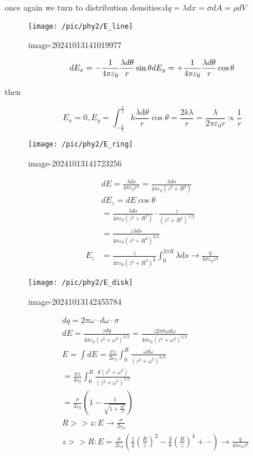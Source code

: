 \documentclass[
]{article}
\begin{document}
once again we turn to distribution
densities:\(\mathrm d q=\lambda d x=\sigma d A=\rho d V\)

\begin{figure}
\centering
\texttt{[image: /pic/phy2/E\_line]}
\caption{image-20241013141019977}
\end{figure}

\[
dE_{x}=-\frac{1}{4\pi\varepsilon_{0}}\frac{\lambda d\theta}{r}\sin\theta\\dE_{y}=+\frac{1}{4\pi\varepsilon_{0}}\frac{\lambda d\theta}{r}\cos\theta
\]

then

\[
E_x=0,E_y=\int_{-{\frac{\pi}{2}}}^{\frac{\pi}{2}} k \frac{\lambda \mathrm d \theta}{r}\cos \theta =\frac{2k\lambda}{r}=\frac{\lambda}{2\pi \varepsilon _0 r}\propto \frac{1}{r}
\]

\begin{figure}
\centering
\texttt{[image: /pic/phy2/E\_ring]}
\caption{image-20241013141723256}
\end{figure}

\[
\begin{aligned}
&dE=\frac{\lambda ds}{4\pi\varepsilon_{0}r^{2}}=\frac{\lambda ds}{4\pi\varepsilon_{0}(z^{2}+R^{2})} \\
&dE_{z}=dE\cos\theta \\
&=\frac{\lambda ds}{4\pi\varepsilon_{0}(z^{2}+R^{2})}\cdot\frac{z}{(z^{2}+R^{2})^{1/2}} \\
&=\frac{z\lambda ds}{4\pi\varepsilon_0(z^2+R^2)^{3/2}}\\E_z&=\frac{z}{4\pi \varepsilon _0(z^2+R^2)^{\frac{3}{2}}}\int _{0}^{2\pi R}\lambda \mathrm ds\to \frac{q}{4\pi \varepsilon _0z^2}
\end{aligned}
\]

\begin{figure}
\centering
\texttt{[image: /pic/phy2/E\_disk]}
\caption{image-20241013142455784}
\end{figure}

\[
\begin{aligned}
&dq=2\pi\omega\cdot d\omega\cdot\sigma \\
&dE=\frac{zdq}{4\pi\varepsilon_{0}(z^{2}+\omega^{2})^{3/2}}=\frac{z2\pi\sigma\omega d\omega}{4\pi\varepsilon_{0}(z^{2}+\omega^{2})^{3/2}} \\
&E=\int dE=\frac{\sigma z}{2\varepsilon_{0}}\int_{0}^{R}\frac{\omega d\omega}{\left(z^{2}+\omega^{2}\right)^{3/2}} \\
&=\frac{\sigma z}{4\varepsilon_{0}}\int_{0}^{R}\frac{d(z^{2}+\omega^{2})}{(z^{2}+\omega^{2})^{3/2}} \\
&=\frac{\sigma}{2\varepsilon_{0}}(1-\frac{1}{\sqrt{1+\frac{R^{2}}{z^{2}}}})\\&R>>z:E\to \frac{\sigma }{2\varepsilon_0}\\&z>>R:E=\frac{\sigma }{2\varepsilon _0}\left(\frac{1}{2}\left(\frac{R}{z}\right)^2-\frac{3}{8}\left(\frac{R}{z}\right)^4+\cdots\right)\to \frac{q}{4\pi \varepsilon _0 z^2}
\end{aligned}
\]
\end{document}
